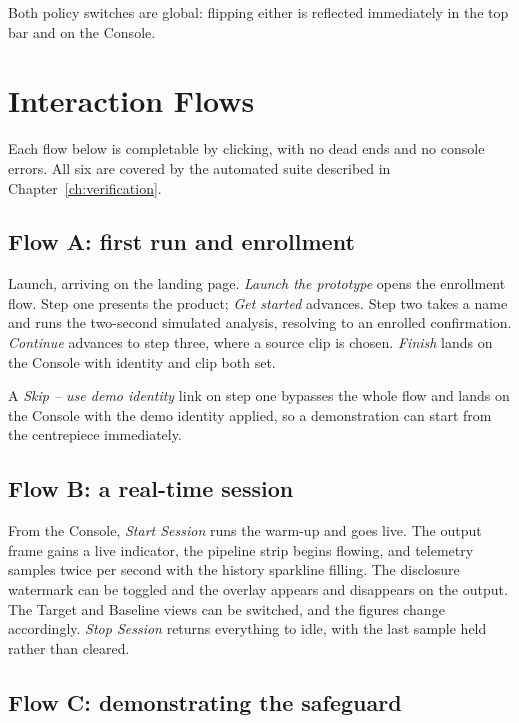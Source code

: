 \documentclass[11pt,a4paper]{report}
\begin{document}
Both policy switches are global: flipping either is reflected immediately in
the top bar and on the Console.

\chapter{Interaction Flows}

Each flow below is completable by clicking, with no dead ends and no console
errors. All six are covered by the automated suite described in
Chapter~\ref{ch:verification}.

\section{Flow A: first run and enrollment}

Launch, arriving on the landing page. \emph{Launch the prototype} opens the
enrollment flow. Step one presents the product; \emph{Get started} advances.
Step two takes a name and runs the two-second simulated analysis, resolving to
an enrolled confirmation. \emph{Continue} advances to step three, where a
source clip is chosen. \emph{Finish} lands on the Console with identity and
clip both set.

A \emph{Skip -- use demo identity} link on step one bypasses the whole flow and
lands on the Console with the demo identity applied, so a demonstration can
start from the centrepiece immediately.

\section{Flow B: a real-time session}

From the Console, \emph{Start Session} runs the warm-up and goes live. The
output frame gains a live indicator, the pipeline strip begins flowing, and
telemetry samples twice per second with the history sparkline filling. The
disclosure watermark can be toggled and the overlay appears and disappears on
the output. The Target and Baseline views can be switched, and the figures
change accordingly. \emph{Stop Session} returns everything to idle, with the
last sample held rather than cleared.

\section{Flow C: demonstrating the safeguard}
\end{document}
